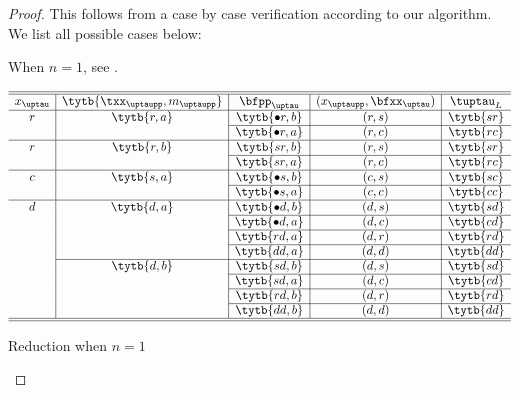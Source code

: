 \documentclass[ssunip]{subfiles}
\begin{document}
  \begin{proof}
    This follows from a case by case verification according to our algorithm.
    We list all possible cases below:

    When $n=1$, see .%
    \begin{table}[p]
      \[
        \begin{array}{c|c|c|c|c}
          \hline
          \hline
          x_{\uptau} & \tytb{{\txx_{\uptaupp}},{m_{\uptaupp}}} & \bfpp_{\uptau} & (x_{\uptaupp},\bfxx_{\uptau}) & \tuptau_{L} \\
          \hline
          r & \tytb{r,a} &  \tytb{\bullet r,b} & (r,s) & \tytb{sr} \\
          \cline{3-5}
                     &            &  \tytb{\bullet r,a} & (r,c) & \tytb{rc} \\
          \hline
          r & \tytb{r,b} &  \tytb{sr,b} & (r,s) & \tytb{sr} \\
          \cline{3-5}
                     &            &  \tytb{sr,a} & (r,c) & \tytb{rc} \\
          \hline
          c & \tytb{s,a} &  \tytb{\bullet s,b} & (c,s) & \tytb{sc} \\
          \cline{3-5}
                     &            &  \tytb{\bullet s,a} & (c,c) & \tytb{cc} \\
          \hline
          d & \tytb{d,a} & \tytb{\bullet d,b} & (d,s) & \tytb{sd} \\
          \cline{3-5}
                     &            & \tytb{\bullet d,a} & (d,c) & \tytb{cd} \\
          \cline{3-5}
                     &            & \tytb{r d,a} & (d,r) & \tytb{rd} \\
          \cline{3-5}
                     &            & \tytb{d d,a} & (d,d) & \tytb{dd} \\
          \cline{2-5}
                     & \tytb{d,b} & \tytb{s d,b} & (d,s) & \tytb{sd} \\
          \cline{3-5}
                     &            & \tytb{s d,a} & (d,c) & \tytb{cd} \\
          \cline{3-5}
                     &            & \tytb{r d,b} & (d,r) & \tytb{rd} \\
          \cline{3-5}
                     &            & \tytb{d d,b} & (d,d) & \tytb{dd} \\
          \hline
          \hline
        \end{array}
      \]
      \caption{Reduction when $n=1$}
      \label{tb:rd1}
    \end{table}


\end{proof}
\end{document}
